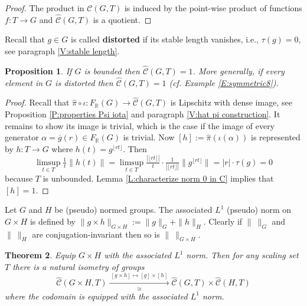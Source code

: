 \documentclass[12pt]{amsart}
\newtheorem{prop}{Proposition}[section]
\newtheorem{theorem}[prop]{Theorem}
\theoremstyle{definition}
\def\RR{\ensuremath{\mathbb{R}}}
\newcommand{\C}[1]{\mathcal{#1}}
\def\Free{F}
\def\tC{\hat{\mathcal{C}}}
\newcommand{\Myfloor}[1]{\lfloor #1 \rfloor}
\begin{document}
\begin{proof}
The product in $\C C(G,T)$ is induced by the point-wise product of functions $f \colon T \to G$ and $\tC(G,T)$ is a quotient.
\end{proof}





Recall that $g \in G$ is called {\bf distorted} if its stable length vanishes, i.e., $\tau(g)=0$, see paragraph \ref{V:stable length}.


\begin{prop}\label{P:distorted => trivial cone}
If $G$ is bounded then $\tC(G,T)=1$.
More generally, if every element in $G$ is distorted then $\tC(G,T)=1$
(cf.  Example \ref{E:symmetric8}).
\end{prop}

\begin{proof}
Recall that $\hat{\pi} \circ \iota \colon \Free_\RR(G) \to \tC(G,T)$ is Lipschitz with dense image, see Proposition \ref{P:properties Psi iota} and paragraph \ref{V:hat pi construction}.
It remains to show its image is trivial, which is the case if the image of every generator $\alpha=\overline{g}(r) \in \Free_\RR(G)$ is trivial.
Now $[h]:=\hat{\pi}(\iota(\alpha))$ is represented by $h \colon T \to G$ where $h(t)=g^{\Myfloor{rt}}$.
Then
\[
\limsup_{t \in T} \tfrac{1}{t}\|h(t)\| = 
\limsup_{t \in T} \tfrac{|\Myfloor{rt}|}{t} \cdot \tfrac{1}{|\Myfloor{rt}|} \| g^{\Myfloor{rt}}\| =
|r| \cdot \tau(g) = 0
\]
because $T$ is unbounded.
Lemma \ref{L:characterize norm 0 in C} implies that $[h]=1$. 
\end{proof}







Let $G$ and $H$ be (pseudo) normed groups.
The associated $L^1$ (pseudo) norm on $G \times H$ is defined by $\|g \times h\|_{G \times H} := \|g\|_G+\|h\|_H$.
Clearly if $\| \ \|_G$ and $\| \ \|_H$ are conjugation-invariant then so is $\| \ \|_{G \times H}$.



\begin{theorem}\label{T:tC products}
Equip $G \times H$ with the associated $L^1$ norm.
Then for any scaling set $T$ there is a natural isometry of groups
\[
\tC(G \times H, T) \xrightarrow[\cong]{ \ [g \times h] \mapsto [g] \times [h] \ } \tC(G,T) \times \tC(H,T)
\]
where the codomain is equipped with the associated $L^1$ norm.
\end{theorem}
\end{document}
